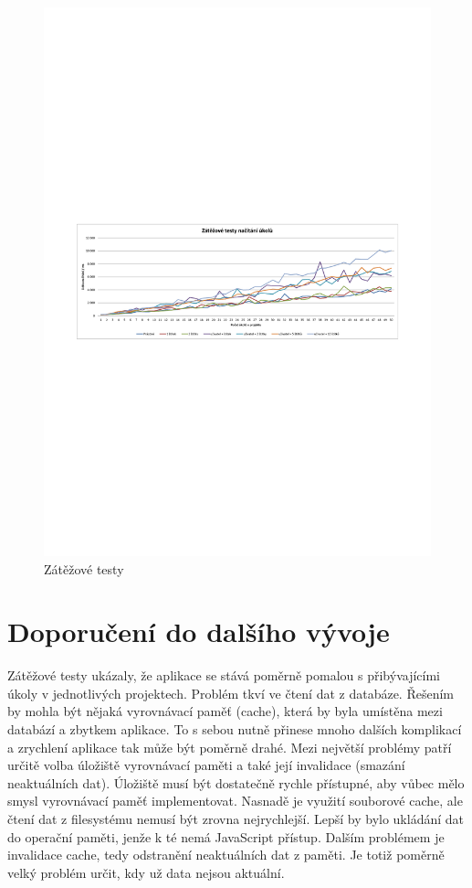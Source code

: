 \begin{figure}[h]
\begin{center}
	\includegraphics[trim=15mm 115mm 15mm 110mm, clip, width=15cm]{figures/zatezove-testy}
	\caption{Zátěžové testy}
	\label{fig:load-tests}
\end{center}
\end{figure}

\section{Doporučení do dalšího vývoje}

Zátěžové testy ukázaly, že aplikace se stává poměrně pomalou s přibývajícími úkoly v jednotlivých projektech. Problém tkví ve čtení dat z databáze. Řešením by mohla být nějaká vyrovnávací paměť (cache), která by byla umístěna mezi databází a zbytkem aplikace. To s sebou nutně přinese mnoho dalších komplikací a zrychlení aplikace tak může být poměrně drahé. Mezi největší problémy patří určitě volba úložiště vyrovnávací paměti a také její invalidace (smazání neaktuálních dat). Úložiště musí být dostatečně rychle přístupné, aby vůbec mělo smysl vyrovnávací paměť implementovat. Nasnadě je využití souborové cache, ale čtení dat z filesystému nemusí být zrovna nejrychlejší. Lepší by bylo ukládání dat do operační paměti, jenže k té nemá JavaScript přístup. Dalším problémem je invalidace cache, tedy odstranění neaktuálních dat z paměti. Je totiž poměrně velký problém určit, kdy už data nejsou aktuální.

